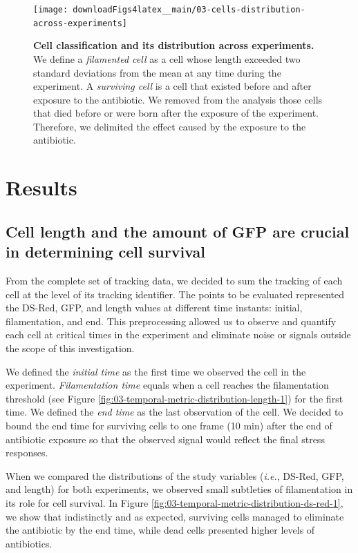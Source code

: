 \documentclass[a4paper, nobind]{templates/ociamthesis}
\begin{document}
\begin{figure}[H]
\texttt{[image: downloadFigs4latex\_\_main/03-cells-distribution-across-experiments]} \caption[Cell classification and its distribution across experiments.]{\textbf{Cell classification and its distribution across experiments.} We define a \emph{filamented cell} as a cell whose length exceeded two standard deviations from the mean at any time during the experiment. A \emph{surviving cell} is a cell that existed before and after exposure to the antibiotic. We removed from the analysis those cells that died before or were born after the exposure of the experiment. Therefore, we delimited the effect caused by the exposure to the antibiotic.}\label{fig:03-cells-distribution-across-experiments}
\end{figure}

\hypertarget{results}{%
\section{Results}\label{results}}

\hypertarget{cell-length-and-the-amount-of-gfp-are-crucial-in-determining-cell-survival}{%
\subsection{Cell length and the amount of GFP are crucial in determining cell survival}\label{cell-length-and-the-amount-of-gfp-are-crucial-in-determining-cell-survival}}

From the complete set of tracking data, we decided to sum the tracking of each cell at the level of its tracking identifier.
The points to be evaluated represented the DS-Red, GFP, and length values at different time instants: initial, filamentation, and end.
This preprocessing allowed us to observe and quantify each cell at critical times in the experiment and eliminate noise or signals outside the scope of this investigation.

We defined the \emph{initial time} as the first time we observed the cell in the experiment.
\emph{Filamentation time} equals when a cell reaches the filamentation threshold (see Figure \ref{fig:03-temporal-metric-distribution-length-1}) for the first time.
We defined the \emph{end time} as the last observation of the cell.
We decided to bound the end time for surviving cells to one frame (10 min) after the end of antibiotic exposure so that the observed signal would reflect the final stress responses.

When we compared the distributions of the study variables (\emph{i.e.}, DS-Red, GFP, and length) for both experiments, we observed small subtleties of filamentation in its role for cell survival.
In Figure \ref{fig:03-temporal-metric-distribution-ds-red-1}, we show that indistinctly and as expected, surviving cells managed to eliminate the antibiotic by the end time, while dead cells presented higher levels of antibiotics.
\end{document}
